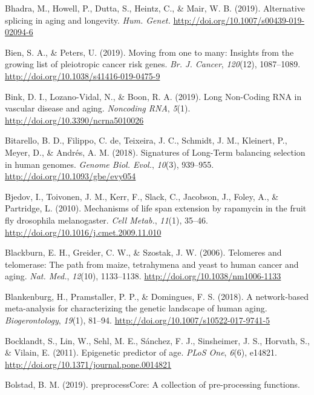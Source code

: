 \documentclass[12pt,twoside]{unicam}
\begin{document}
\begin{cslreferences}
\leavevmode\hypertarget{ref-Bhadra2019}{}%
Bhadra, M., Howell, P., Dutta, S., Heintz, C., \& Mair, W. B. (2019). Alternative splicing in aging and longevity. \emph{Hum. Genet.} \url{http://doi.org/10.1007/s00439-019-02094-6}

\leavevmode\hypertarget{ref-Bien2019}{}%
Bien, S. A., \& Peters, U. (2019). Moving from one to many: Insights from the growing list of pleiotropic cancer risk genes. \emph{Br. J. Cancer}, \emph{120}(12), 1087--1089. \url{http://doi.org/10.1038/s41416-019-0475-9}

\leavevmode\hypertarget{ref-Bink2019}{}%
Bink, D. I., Lozano-Vidal, N., \& Boon, R. A. (2019). Long Non-Coding RNA in vascular disease and aging. \emph{Noncoding RNA}, \emph{5}(1). \url{http://doi.org/10.3390/ncrna5010026}

\leavevmode\hypertarget{ref-Bitarello2018}{}%
Bitarello, B. D., Filippo, C. de, Teixeira, J. C., Schmidt, J. M., Kleinert, P., Meyer, D., \& Andrés, A. M. (2018). Signatures of Long-Term balancing selection in human genomes. \emph{Genome Biol. Evol.}, \emph{10}(3), 939--955. \url{http://doi.org/10.1093/gbe/evy054}

\leavevmode\hypertarget{ref-Bjedov2010}{}%
Bjedov, I., Toivonen, J. M., Kerr, F., Slack, C., Jacobson, J., Foley, A., \& Partridge, L. (2010). Mechanisms of life span extension by rapamycin in the fruit fly drosophila melanogaster. \emph{Cell Metab.}, \emph{11}(1), 35--46. \url{http://doi.org/10.1016/j.cmet.2009.11.010}

\leavevmode\hypertarget{ref-Blackburn2006}{}%
Blackburn, E. H., Greider, C. W., \& Szostak, J. W. (2006). Telomeres and telomerase: The path from maize, tetrahymena and yeast to human cancer and aging. \emph{Nat. Med.}, \emph{12}(10), 1133--1138. \url{http://doi.org/10.1038/nm1006-1133}

\leavevmode\hypertarget{ref-Blankenburg2018}{}%
Blankenburg, H., Pramstaller, P. P., \& Domingues, F. S. (2018). A network-based meta-analysis for characterizing the genetic landscape of human aging. \emph{Biogerontology}, \emph{19}(1), 81--94. \url{http://doi.org/10.1007/s10522-017-9741-5}

\leavevmode\hypertarget{ref-Bocklandt2011}{}%
Bocklandt, S., Lin, W., Sehl, M. E., Sánchez, F. J., Sinsheimer, J. S., Horvath, S., \& Vilain, E. (2011). Epigenetic predictor of age. \emph{PLoS One}, \emph{6}(6), e14821. \url{http://doi.org/10.1371/journal.pone.0014821}

\leavevmode\hypertarget{ref-Bolstad2019}{}%
Bolstad, B. M. (2019). preprocessCore: A collection of pre-processing functions.


\end{cslreferences}
\end{document}
